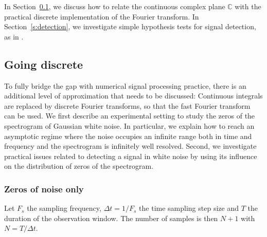In Section~\ref{s:implementation}, we discuss how to relate the continuous
complex plane $\mathbb{C}$ with the practical discrete implementation of the
Fourier transform. In Section~\ref{s:detection}, we investigate simple
hypothesis tests for signal detection, as in \citep{Fla15}. 

\subsection{Going discrete}
\label{s:implementation}
To fully bridge the gap with numerical signal processing practice, there is an
additional level of approximation that needs to be discussed: Continuous
integrals are replaced by discrete Fourier transforms, so that the fast Fourier
transform can be used. We first describe an experimental setting to study the zeros of the spectrogram of Gaussian white noise. In particular, we explain how to reach an asymptotic regime where the noise occupies an infinite range both in time and frequency and the spectrogram is infinitely well resolved.
Second, we investigate practical issues related to detecting a signal in white
noise by using its influence on the distribution of zeros of the spectrogram. 



\subsubsection{Zeros of noise only}
\label{s:noiseonly}
Let $F_s$ the sampling frequency, $\Delta t=1/F_s$ the time sampling step size
and $T$ the duration of the observation window. The number of samples is then $N +1$ with 
$N = T/\Delta t$. 


